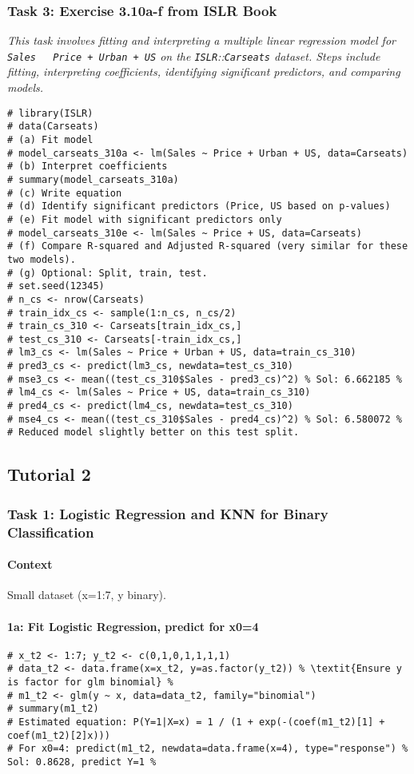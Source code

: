 \documentclass[12pt,a4paper]{article}
\newcommand{\Rpackage}[1]{\texttt{#1}} %
\newcommand{\Robject}[1]{\texttt{#1}} %
\newcommand{\Rcode}[1]{\texttt{#1}} %
\begin{document}
        \subsubsection{Task 3: Exercise 3.10a-f from ISLR Book}
            \textit{This task involves fitting and interpreting a multiple linear regression model for \Rcode{Sales ~ Price + Urban + US} on the \Rpackage{ISLR}::\Robject{Carseats} dataset. Steps include fitting, interpreting coefficients, identifying significant predictors, and comparing models.}
\begin{lstlisting}
# library(ISLR)
# data(Carseats)
# (a) Fit model
# model_carseats_310a <- lm(Sales ~ Price + Urban + US, data=Carseats)
# (b) Interpret coefficients
# summary(model_carseats_310a)
# (c) Write equation
# (d) Identify significant predictors (Price, US based on p-values)
# (e) Fit model with significant predictors only
# model_carseats_310e <- lm(Sales ~ Price + US, data=Carseats)
# (f) Compare R-squared and Adjusted R-squared (very similar for these two models).
# (g) Optional: Split, train, test.
# set.seed(12345)
# n_cs <- nrow(Carseats)
# train_idx_cs <- sample(1:n_cs, n_cs/2)
# train_cs_310 <- Carseats[train_idx_cs,]
# test_cs_310 <- Carseats[-train_idx_cs,]
# lm3_cs <- lm(Sales ~ Price + Urban + US, data=train_cs_310)
# pred3_cs <- predict(lm3_cs, newdata=test_cs_310)
# mse3_cs <- mean((test_cs_310$Sales - pred3_cs)^2) % Sol: 6.662185 %
# lm4_cs <- lm(Sales ~ Price + US, data=train_cs_310)
# pred4_cs <- predict(lm4_cs, newdata=test_cs_310)
# mse4_cs <- mean((test_cs_310$Sales - pred4_cs)^2) % Sol: 6.580072 %
# Reduced model slightly better on this test split.
\end{lstlisting}

    \subsection{Tutorial 2 }
        \subsubsection{Task 1: Logistic Regression and KNN for Binary Classification}
            \paragraph{Context} Small dataset (x=1:7, y binary).
            \paragraph{1a: Fit Logistic Regression, predict for x0=4}
\begin{lstlisting}
# x_t2 <- 1:7; y_t2 <- c(0,1,0,1,1,1,1)
# data_t2 <- data.frame(x=x_t2, y=as.factor(y_t2)) % \textit{Ensure y is factor for glm binomial} %
# m1_t2 <- glm(y ~ x, data=data_t2, family="binomial")
# summary(m1_t2)
# Estimated equation: P(Y=1|X=x) = 1 / (1 + exp(-(coef(m1_t2)[1] + coef(m1_t2)[2]x)))
# For x0=4: predict(m1_t2, newdata=data.frame(x=4), type="response") % Sol: 0.8628, predict Y=1 %
\end{lstlisting}
\end{document}
